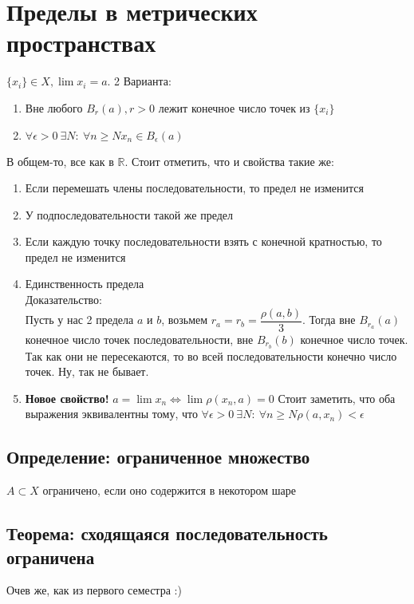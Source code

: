 \documentclass[12pt]{report} %
\begin{document}
\section*{Пределы в метрических пространствах}
$\{x_i\} \in X, \lim{x_i} = a$. 2 Варианта:
\begin{enumerate}
\item Вне любого $B_r(a), r > 0$ лежит конечное число точек из $\{x_i\}$
\item $\forall \epsilon > 0 \ \exists N: \ \forall n \geqslant N x_n \in B_{\epsilon}(a)$
\end{enumerate}
В общем-то, все как в $\mathbb{R}$. Стоит отметить, что и свойства такие же:
\begin{enumerate}
\item Если перемешать члены последовательности, то предел не изменится
\item У подпоследовательности такой же предел
\item Если каждую точку последовательности взять с конечной кратностью, то предел не изменится
\item Единственность предела\\

Доказательство:\\

Пусть у нас 2 предела $a$ и $b$, возьмем $r_a = r_b = \dfrac{\rho(a, b)}{3}$. Тогда вне $B_{r_a}(a)$ конечное число точек последовательности, вне $B_{r_b}(b)$ конечное число точек. Так как они не пересекаются, то во всей последовательности конечно число точек. Ну, так не бывает. 
\item \textbf{Новое свойство!} $a = \lim x_n \Leftrightarrow \lim \rho(x_n, a) = 0$
Стоит заметить, что оба выражения эквивалентны тому, что $\forall \epsilon > 0 \ \exists N : \ \forall n \geqslant N \rho(a, x_n) < \epsilon$
\end{enumerate}
\subsection*{Определение: ограниченное множество}
$A \subset X$ ограничено, если оно содержится в некотором шаре

\subsection*{Теорема: сходящаяся последовательность ограничена}
Очев же, как из первого семестра :)
\end{document}
